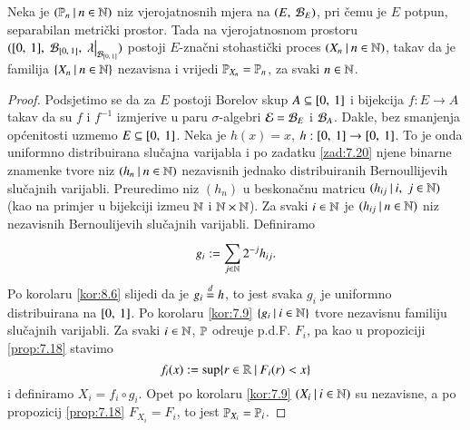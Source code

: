 \begin{tm}  \label{tm:8.11}
    Neka je $({\mathbb{P}_n} \: | \: {n \in \mathbb{N}})$ niz vjerojatnosnih mjera na $({E}, \: {\mathcal{B}_{E}})$, pri \v cemu je $E$ potpun, separabilan metri\v cki prostor.
    Tada na vjerojatnosnom prostoru $(\segment{0}{1}, \; \borel{\segment{0}{1}}, \; \restr{\lambda}{\borel{\segment{0}{1}}})$ postoji $E$-zna\v cni stohasti\v cki proces $({X_n} \: | \: {n \in \mathbb{N}})$, takav da je familija $\{{X_n} \: | \: {n \in \mathbb{N}}\}$ nezavisna i vrijedi $\mathbb{P}_{X_n} = \mathbb{P}_n$, za svaki $n \in \mathbb{N}$.
\end{tm}

\begin{proof}
    Podsjetimo se da za $E$ postoji Borelov skup $A \subseteq [{0}, \:{1}]$ i bijekcija $f : E \to A$ takav da su $f$ i $f^{-1}$ izmjerive u paru $\sigma$-algebri $\mathcal{E} =  \mathcal{B}_{E}$ i $\mathcal{B}_{A}$.
    Dakle, bez smanjenja op\' cenitosti uzmemo $E \subseteq [{0}, \:{1}]$. Neka je $h(x) = x$, $h: [{0}, \:{1}] \to [{0}, \:{1}]$.
    To je onda uniformno distribuirana slu\v cajna varijabla i po zadatku \ref{zad:7.20} njene binarne znamenke tvore niz $({h_n} \: | \: {n \in \mathbb{N}})$ nezavisnih jednako distribuiranih Bernoullijevih slu\v cajnih varijabli.
    Preuredimo niz $(h_n)$ u beskona\v cnu matricu $({h_{ij}} \: | \: {i, \; j \in \mathbb{N}})$ (kao na primjer u bijekciji izme\dj u $\mathbb{N}$ i $\mathbb{N} \times \mathbb{N}$).
    Za svaki $i \in \mathbb{N}$ je $({h_{ij}} \: | \: {n \in \mathbb{N}})$ niz nezavisnih Bernoulijevih slu\v cajnih varijabli.
    Definiramo
    \begin{equation*}
        g_i := \sum\limits_{j \in \mathbb{N}}^{} 2^{-j} h_{ij}.
    \end{equation*}
    Po korolaru \ref{kor:8.6} slijedi da je $g_i \overset{d}{=} h$, to jest svaka $g_i$ je uniformno distribuirana na $[{0}, \:{1}]$.
    Po korolaru \ref{kor:7.9} $\{{g_i} \: | \: {i \in \mathbb{N}}\}$ tvore nezavisnu familiju slu\v cajnih varijabli.
    Za svaki $i \in \mathbb{N}$, $\mathbb{P}$ odre\dj uje p.d.F. $F_i$, pa kao u propoziciji \ref{prop:7.18} stavimo
    \begin{equation*}
        f_i (x) := \sup \{{r \in \mathbb{R}} \: | \: {F_i (r) < x}\}
    \end{equation*}
    i definiramo $X_i = f_i \circ g_i$.
    Opet po korolaru \ref{kor:7.9} $({X_i} \: | \: {i \in \mathbb{N}})$ su nezavisne, a po propozicij \ref{prop:7.18} $F_{X_i} = F_i$, to jest $\mathbb{P}_{X_i} = \mathbb{P}_i$.
\end{proof}